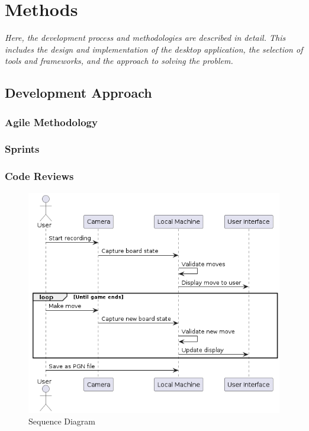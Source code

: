 \chapter{Methods}

\begin{center}
    \textit{Here, the development process and methodologies are described in detail. This includes the design and implementation of the desktop application, the selection of tools and frameworks, and the approach to solving the problem.}
\end{center}




\section{Development Approach}

\subsection{Agile Methodology}

\subsection{Sprints}

\subsection{Code Reviews}

\begin{figure}[h!]
    \centering
    \includegraphics[width=0.75\linewidth]{figures/uml/sequence.png}
    \caption{Sequence Diagram}
    \label{fig:sequence}
\end{figure}

